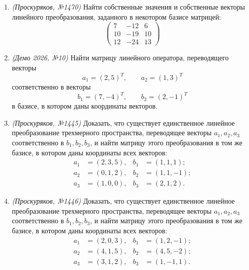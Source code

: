 \begin{enumerate}
    \item \textit{(Проскуряков, №1470)} Найти собственные значения и собственные векторы линейного преобразования, заданного в некотором базисе матрицей:
    \[
    \begin{pmatrix}
     7 & -12 &  6 \\
    10 & -19 & 10 \\
    12 & -24 & 13
    \end{pmatrix}
    \]

    \item \textit{(Демо 2026, №10)}
    Найти матрицу линейного оператора, переводящего векторы
    \[
    a_1=(2,5)^T,\qquad a_2=(1,3)^T
    \]
    соответственно в векторы
    \[
    b_1=(7,-4)^T,\qquad b_2=(2,-1)^T
    \]
    в базисе, в котором даны координаты векторов.

    \item \textit{(Проскуряков, №1445)} Доказать, что существует единственное линейное преобразование трехмерного пространства, переводящее векторы $a_1, a_2, a_3$ соответственно в $b_1, b_2, b_3$, и найти матрицу этого преобразования в том же базисе, в котором даны координаты всех векторов:
    \begin{align*}
    a_1 &= (2, 3, 5), & b_1 &= (1, 1, 1); \\
    a_2 &= (0, 1, 2), & b_2 &= (1, 1, -1); \\
    a_3 &= (1, 0, 0), & b_3 &= (2, 1, 2).
    \end{align*}

    \item \textit{(Проскуряков, №1446)} Доказать, что существует единственное линейное преобразование трехмерного пространства, переводящее векторы $a_1, a_2, a_3$ соответственно в $b_1, b_2, b_3$, и найти матрицу этого преобразования в том же базисе, в котором даны координаты всех векторов:
    \begin{align*}
    a_1 &= (2, 0, 3), & b_1 &= (1, 2, -1); \\
    a_2 &= (4, 1, 5), & b_2 &= (4, 5, -2); \\
    a_3 &= (3, 1, 2), & b_3 &= (1, -1, 1).
    \end{align*}


\end{enumerate}
